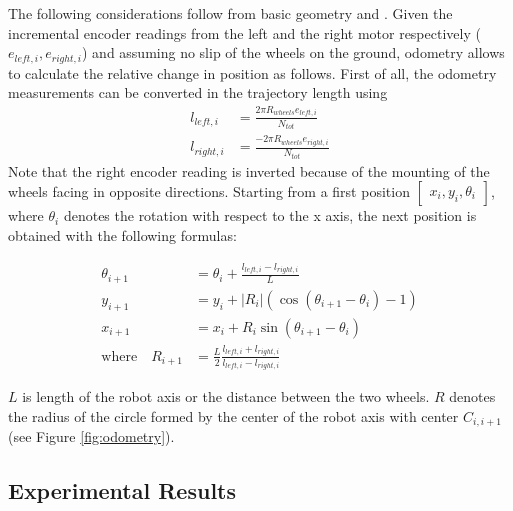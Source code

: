 The following considerations follow from basic geometry and \cite{Borenstein1996}.
Given the incremental encoder readings from the left and the right motor respectively ($e_{left,i},e_{right,i}$) and assuming no slip of the wheels on the ground, odometry allows to calculate the relative change in position as follows.
First of all, the odometry measurements can be converted in the trajectory length using
\begin{align}
    l_{left,i} &= \frac{2\pi R_{wheels} e_{left,i}}{N_{tot}} \\
    l_{right,i} &= \frac{-2\pi R_{wheels} e_{right,i}}{N_{tot}}
    \label{eq:encoders} 
\end{align}
Note that the right encoder reading is inverted because of the mounting of the wheels facing in opposite directions.
Starting from a first position $\begin{bmatrix} x_i,y_i,\theta_i \end{bmatrix}$, where $\theta_i$ denotes the rotation with respect to the x axis, the next position is obtained with the following formulas:

\begin{subequations}
    \begin{align}
        \theta_{i+1} &= \theta_i + \frac{l_{left,i}-l_{right,i}}{L} \\
        y_{i+1} &= y_i + |R_i| (\cos(\theta_{i+1}-\theta_{i})-1) \\
        x_{i+1} &= x_i + R_i \sin(\theta_{i+1}-\theta_i) \\
        \text{where} \quad R_{i+1} &= \frac{L}{2} \frac{l_{left,i}+l_{right,i}}{l_{left,i}-l_{right,i}} 
    \label{eq:positions}
\end{align}
\end{subequations}

$L$ is length of the robot axis or the distance between the two wheels. 
$R$ denotes the radius of the circle formed by the center of the robot axis with center $C_{i,i+1}$ (see Figure \ref{fig:odometry}).

\subsection{Experimental Results}



